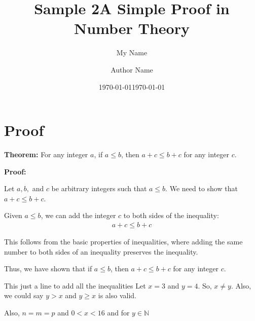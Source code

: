 \documentclass{article} %
\title{Sample 2} %
\author{My Name} %
\date{\today} %
\begin{document}
\title{A Simple Proof in Number Theory}
\author{Author Name}
\date{\today}
\maketitle

\section*{Proof}

\textbf{Theorem:} For any integer $a$, if $a \leq b$, then $a + c \leq b + c$ for any integer $c$.

\textbf{Proof:}

Let $a, b,$ and $c$ be arbitrary integers such that $a \leq b$. We need to show that $a + c \leq b + c$.

Given $a \leq b$, we can add the integer $c$ to both sides of the inequality:
\begin{equation}
    \begin{split}
        a + c \leq b + c
    \end{split}
\end{equation}

This follows from the basic properties of inequalities, where adding the same number to both sides of an inequality preserves the inequality.

Thus, we have shown that if $a \leq b$, then $a + c \leq b + c$ for any integer $c$. \n

This just a line to add all the inequalities Let $x = 3$ and $y = 4$. So, $x \neq y$. Also, we could say $y > x$ and $y \geq x$ is also valid.

Also, $n = m = p$ and $0 < x < 16$ and for $ y \in \mathbb{N}$
\end{document}
